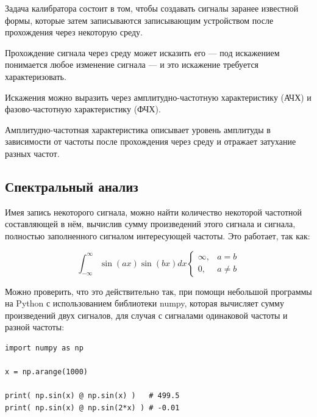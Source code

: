 \documentclass[rusmathsym, eqnumwithinsec, amspack, hyperref]{bomgost}
\begin{document}
Задача калибратора состоит в том, чтобы создавать сигналы заранее известной формы, которые затем записываются записывающим устройством после прохождения через некоторую среду.

Прохождение сигнала через среду может исказить его --- под искажением понимается любое изменение сигнала --- и это искажение требуется характеризовать.

Искажения можно выразить через амплитудно-частотную характеристику (АЧХ) и фазово-частотную характеристику (ФЧХ).

Амплитудно-частотная характеристика описывает уровень амплитуды в зависимости от частоты после прохождения через среду и отражает затухание разных частот.

\subsection{Спектральный анализ}

Имея запись некоторого сигнала, можно найти количество некоторой частотной составляющей в нём, вычислив сумму произведений этого сигнала и сигнала, полностью заполненного сигналом интересующей частоты. Это работает, так как:

\begin{equation}
	\int_{-\infty}^{\infty}{\sin(ax)\sin(bx)}{dx}
	\begin{cases}
		\infty,& a = b\\
		0,     & a \neq b
	\end{cases}
\end{equation}

Можно проверить, что это действительно так, при помощи небольшой программы на Python с использованием библиотеки numpy, которая вычисляет сумму произведений двух сигналов, для случая с сигналами одинаковой частоты и разной частоты:

\lstset{
	language=c,
	basicstyle=\scriptsize\ttfamily,
	numbers=left,
	stepnumber=1,
	showstringspaces=false,
	tabsize=4,
	breaklines=true,
	breakatwhitespace=false,
	xleftmargin=.1\textwidth, xrightmargin=.1\textwidth,
	belowskip=1em, aboveskip=1em
}
\begin{lstlisting}
import numpy as np

x = np.arange(1000)

print( np.sin(x) @ np.sin(x) )   # 499.5
print( np.sin(x) @ np.sin(2*x) ) # -0.01
\end{lstlisting}
\end{document}
